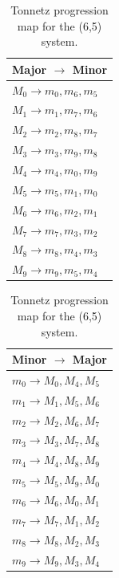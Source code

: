 \documentclass[11pt,letterpaper]{amsart}
\begin{document}
{\tiny \begin{table}[H]
    \centering
    \begin{minipage}{0.48\textwidth}
        \centering
        \begin{tabular}{l}
        \toprule
        \textbf{Major $\to$ Minor} \\
        \midrule
        $M_0 \to m_0, m_6, m_5$ \\
        $M_1 \to m_1, m_7, m_6$ \\
        $M_2 \to m_2, m_8, m_7$ \\
        $M_3 \to m_3, m_9, m_8$ \\
        $M_4 \to m_4, m_0, m_9$ \\
        $M_5 \to m_5, m_1, m_0$ \\
        $M_6 \to m_6, m_2, m_1$ \\
        $M_7 \to m_7, m_3, m_2$ \\
        $M_8 \to m_8, m_4, m_3$ \\
        $M_9 \to m_9, m_5, m_4$ \\
        \bottomrule
        \end{tabular}
    \end{minipage}\hfill
    \begin{minipage}{0.48\textwidth}
        \centering
        \begin{tabular}{l}
        \toprule
        \textbf{Minor $\to$ Major} \\
        \midrule
        $m_0 \to M_0, M_4, M_5$ \\
        $m_1 \to M_1, M_5, M_6$ \\
        $m_2 \to M_2, M_6, M_7$ \\
        $m_3 \to M_3, M_7, M_8$ \\
        $m_4 \to M_4, M_8, M_9$ \\
        $m_5 \to M_5, M_9, M_0$ \\
        $m_6 \to M_6, M_0, M_1$ \\
        $m_7 \to M_7, M_1, M_2$ \\
        $m_8 \to M_8, M_2, M_3$ \\
        $m_9 \to M_9, M_3, M_4$ \\
        \bottomrule
        \end{tabular}
    \end{minipage}
    \caption{Tonnetz progression map for the (6,5) system.}
\end{table}}
\end{document}
